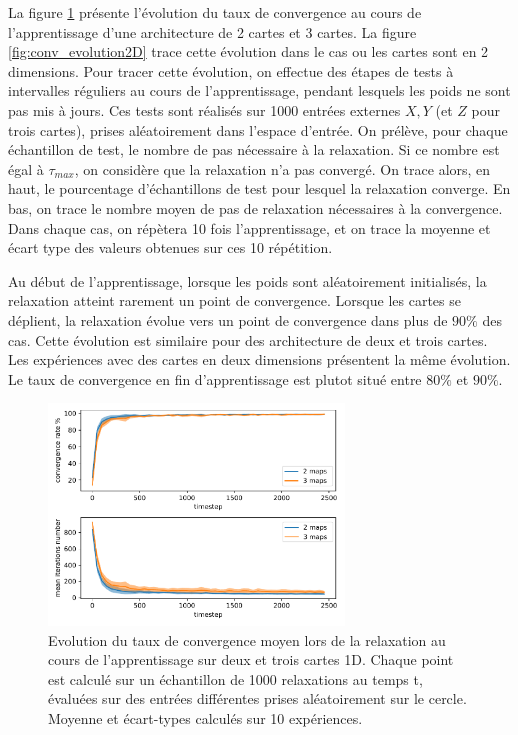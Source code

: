 La figure \ref{fig:conv_evolution} présente l'évolution du taux de convergence au cours de l'apprentissage d'une architecture de 2 cartes et 3 cartes. La figure \ref{fig:conv_evolution2D} trace  cette évolution dans le cas ou les cartes sont en 2 dimensions. Pour tracer cette évolution, on effectue des étapes de tests à intervalles réguliers au cours de l'apprentissage, pendant lesquels les poids ne sont pas mis à jours. Ces tests sont réalisés sur 1000 entrées externes $X,Y$ (et $Z$ pour trois cartes), prises aléatoirement dans l'espace d'entrée. On prélève, pour chaque échantillon de test, le nombre de pas nécessaire à la relaxation. Si ce nombre est égal à $\tau_{max}$, on considère que la relaxation n'a pas convergé. On trace alors, en haut, le pourcentage d'échantillons de test pour lesquel la relaxation converge. En bas, on trace le nombre moyen de pas de relaxation nécessaires à la convergence.
Dans chaque cas, on répètera 10 fois l'apprentissage, et on trace la moyenne et écart type des valeurs obtenues sur ces 10 répétition.

Au début de l'apprentissage, lorsque les poids sont aléatoirement initialisés, la relaxation atteint rarement un point de convergence. Lorsque les cartes se déplient, la relaxation évolue vers un point de convergence dans plus de $90 \%$ des cas. Cette évolution est similaire pour des architecture de deux et trois cartes. Les expériences avec des cartes en deux dimensions présentent la même évolution. Le taux de convergence en fin d'apprentissage est plutot situé entre $80 \%$ et $90 \%$.
 
\begin{figure}
\centering
\includegraphics[width=0.7\textwidth]{1D_conv_evolution_total.pdf}
\caption{Evolution du taux de convergence moyen lors de la relaxation au cours de l'apprentissage sur deux et trois cartes 1D. Chaque point est calculé sur un échantillon de 1000 relaxations au temps t, évaluées sur des entrées différentes prises aléatoirement sur le cercle. Moyenne et écart-types calculés sur 10 expériences.}
\label{fig:conv_evolution}
\end{figure}


